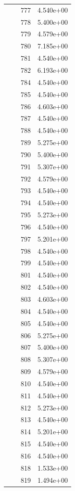\documentclass[12pt]{article}
\begin{document}
\begin{longtable}{@{}cccc@{}}
 &  & 777 & 4.540e+00 \\
 &  & 778 & 5.400e+00 \\
 &  & 779 & 4.579e+00 \\
 &  & 780 & 7.185e+00 \\
 &  & 781 & 4.540e+00 \\
 &  & 782 & 6.193e+00 \\
 &  & 784 & 4.540e+00 \\
 &  & 785 & 4.540e+00 \\
 &  & 786 & 4.603e+00 \\
 &  & 787 & 4.540e+00 \\
 &  & 788 & 4.540e+00 \\
 &  & 789 & 5.275e+00 \\
 &  & 790 & 5.400e+00 \\
 &  & 791 & 5.307e+00 \\
 &  & 792 & 4.579e+00 \\
 &  & 793 & 4.540e+00 \\
 &  & 794 & 4.540e+00 \\
 &  & 795 & 5.273e+00 \\
 &  & 796 & 4.540e+00 \\
 &  & 797 & 5.201e+00 \\
 &  & 798 & 4.540e+00 \\
 &  & 799 & 4.540e+00 \\
 &  & 801 & 4.540e+00 \\
 &  & 802 & 4.540e+00 \\
 &  & 803 & 4.603e+00 \\
 &  & 804 & 4.540e+00 \\
 &  & 805 & 4.540e+00 \\
 &  & 806 & 5.275e+00 \\
 &  & 807 & 5.400e+00 \\
 &  & 808 & 5.307e+00 \\
 &  & 809 & 4.579e+00 \\
 &  & 810 & 4.540e+00 \\
 &  & 811 & 4.540e+00 \\
 &  & 812 & 5.273e+00 \\
 &  & 813 & 4.540e+00 \\
 &  & 814 & 5.201e+00 \\
 &  & 815 & 4.540e+00 \\
 &  & 816 & 4.540e+00 \\
 &  & 818 & 1.533e+00 \\
 &  & 819 & 1.494e+00 \\

\end{longtable}
\end{document}
